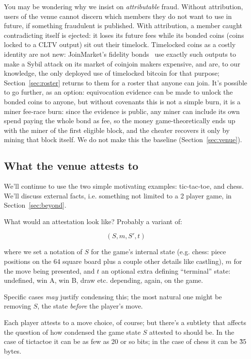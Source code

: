 \documentclass[11pt]{article}
\begin{document}
You may be wondering why we insist on \emph{attributable} fraud. Without attribution, users of the venue cannot discern which members they do not want to use in future, if something fraudulent is published. With attribution, a member caught contradicting itself is ejected: it loses its future fees while its bonded coins (coins locked to a CLTV output) sit out their timelock. Timelocked coins as a costly identity are not new: JoinMarket's fidelity bonds~\cite{fidelity} use exactly such outputs to make a Sybil attack on its market of coinjoin makers expensive, and are, to our knowledge, the only deployed use of timelocked bitcoin for that purpose; Section~\ref{sec:roster} returns to them for a roster that anyone can join. It's possible to go further, as an option: equivocation evidence can be made to unlock the bonded coins to anyone, but without covenants this is not a simple burn, it is a miner fee-race burn: since the evidence is public, any miner can include its own spend paying the whole bond as fee, so the money game-theoretically ends up with the miner of the first eligible block, and the cheater recovers it only by mining that block itself. We do not make this the baseline (Section~\ref{sec:venue}).

\subsection{What the venue attests to}
\label{sec:attests}

We'll continue to use the two simple motivating examples: tic-tac-toe, and chess. We'll discuss external facts, i.e. something not limited to a 2 player game, in Section~\ref{sec:beyond}.

What would an attestation look like? Probably a variant of:

\[ (S, m, S', t) \]

where we set a notation of $S$ for the game's internal state (e.g. chess: piece positions on the 64 square board plus a couple other details like castling), $m$ for the move being presented, and $t$ an optional extra defining ``terminal'' state: undefined, win A, win B, draw etc. depending, again, on the game.

Specific cases \emph{may} justify condensing this; the most natural one might be removing $S$, the state \emph{before} the player's move.

Each player attests to a move choice, of course; but there's a subtlety that affects the question of how condensed the game state $S$ attested to should be. In the case of tictactoe it can be as few as 20 or so bits; in the case of chess it can be \~ 35 bytes.
\end{document}

